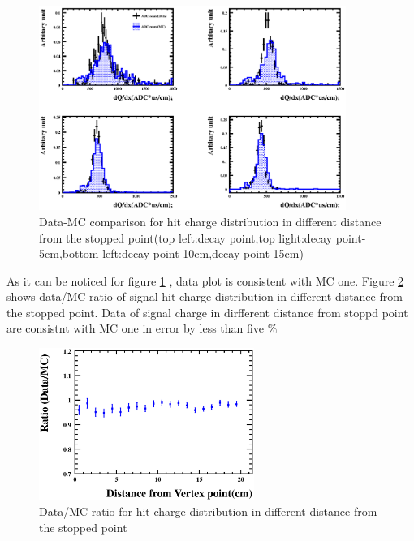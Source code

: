 \begin{figure}[!htb]
  \begin{center}
    \includegraphics[width=100mm]{fig/RangeVsHit4_wcut_hough.eps}
  \end{center}
  \caption{Data-MC comparison for hit charge distribution in different distance from the stopped point(top left:decay point,top light:decay point-5cm,bottom left:decay point-10cm,decay point-15cm)}
  \label{RangeVsHit_hough}
\end{figure}

As it can be noticed for figure \ref{RangeVsHit_hough} , data plot is consistent with MC one.
Figure \ref{RangeVsHitRatio_hough} shows data/MC ratio of signal hit charge distribution in different distance from the stopped point.
Data of signal charge in dirfferent distance from stoppd point are consistnt with MC one in error by less than five $\%$ 

\begin{figure}[htb]
  \begin{center}
    \includegraphics[width=70mm]{fig/RangeVsHitRatio_wcut_hough.eps}
  \end{center}
  \caption{Data/MC ratio for hit charge distribution in different distance from the stopped point}
  \label{RangeVsHitRatio_hough}
\end{figure}



